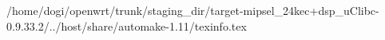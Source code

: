 /home/dogi/openwrt/trunk/staging_dir/target-mipsel_24kec+dsp_uClibc-0.9.33.2/../host/share/automake-1.11/texinfo.tex